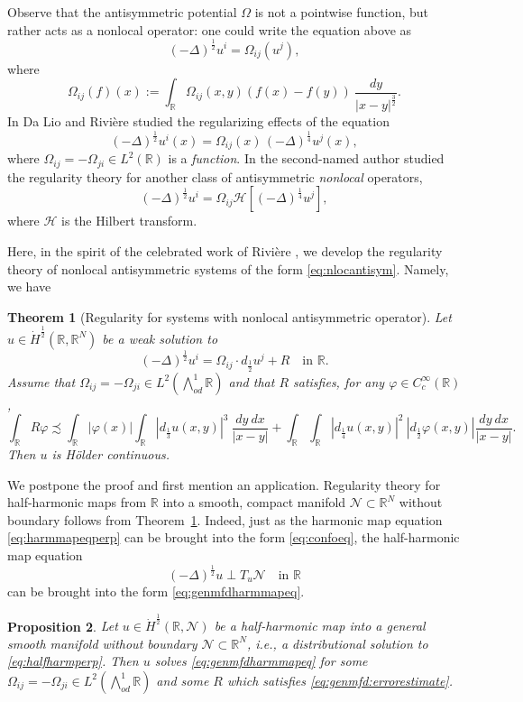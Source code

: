 \documentclass[12pt]{amsart}
\newtheorem{theorem}{Theorem}
\newtheorem{proposition}[theorem]{Proposition}
\theoremstyle{definition}
\newcommand{\R}{\mathbb{R}}
\newcommand{\Ep}{\bigwedge\nolimits}
\numberwithin{theorem}{section} \numberwithin{equation}{section}
\newcommand{\lap}{\Delta }
\newcommand{\aleq}{\precsim}
\newcommand{\lapv}{(-\lap)^{\frac{1}{4}}}
\newcommand{\laph}{(-\lap)^{\frac{1}{2}}}
\begin{document}
Observe that the antisymmetric potential $\Omega$ is not a pointwise function, but rather acts as a nonlocal operator: one could write the equation above as
\[
 \laph u^i = \Omega_{ij}(u^j),
\]
where
\[
 \Omega_{ij}(f)(x) := \int_{\R} \Omega_{ij}(x,y) (f(x)-f(y))\ \frac{dy}{|x-y|^{\frac{3}{2}}}.
\]
% 
In \cite{DaLio-Riviere-1Dmfd} Da Lio and Rivi\`{e}re studied the regularizing effects of the equation
\[
 \laph u^i(x) = \Omega_{ij}(x)\, \lapv u^j(x),
\]
where $\Omega_{ij} = -\Omega_{ji} \in L^2(\R)$ is a \emph{function}. In \cite{Schikorra-eps} the second-named author studied the regularity theory for another class of antisymmetric \emph{nonlocal} operators,
\[
 \laph u^i = \Omega_{ij} \mathcal{H}[\lapv u^j],
\]
where $\mathcal{H}$ is the Hilbert transform.

Here, in the spirit of the celebrated work of Rivi\`{e}re \cite{Riviere-2007}, we develop the regularity theory of nonlocal antisymmetric systems of the form \eqref{eq:nlocantisym}. Namely, we have
% 
\begin{theorem}[Regularity for systems with nonlocal antisymmetric operator]\label{th:nlao}
Let $u \in \dot{H}^{\frac{1}{2}}(\R,\R^N)$ be a weak solution to 
\begin{equation}\label{eq:genmfdharmmapeq}
 \laph u^i = \Omega_{ij} \cdot d_{\frac{1}{2}} u^j + R \quad \mbox{in $\R$}.
\end{equation}
Assume that $\Omega_{ij} = - \Omega_{ji} \in L^2(\Ep^1_{od} \R)$ and that $R$ satisfies, for any $\varphi \in C_c^\infty(\R)$,
\begin{equation}\label{eq:genmfd:errorestimate}
 \int_{\R} R \varphi \aleq \int_{\R}|\varphi(x)| \int_{\R} |d_{\frac{1}{3}}u(x,y)|^3\ \frac{dy\ dx}{|x-y|} + \int_{\R}\int_{\R} |d_{\frac{1}{4}}u(x,y)|^2\ |d_{\frac{1}{2}}\varphi(x,y)| \frac{dy\ dx}{|x-y|}.
\end{equation}
Then $u$ is H\"older continuous.
\end{theorem}
% 
We postpone the proof and first mention an application. 
Regularity theory for half-harmonic maps from $\R$ into a smooth, compact manifold $\mathcal{N} \subset \R^N$ without boundary follows from Theorem~\ref{th:nlao}. Indeed, 
just as the harmonic map equation \eqref{eq:harmmapeqperp} can be brought into the form \eqref{eq:confoeq}, the half-harmonic map equation 
\begin{equation}\label{eq:halfharmperp}
 \laph u \perp T_u \mathcal{N} \quad \mbox{in $\R$}
\end{equation}
can be brought into the form \eqref{eq:genmfdharmmapeq}.
% 
\begin{proposition}\label{pr:genmfdEL}
Let $u \in \dot{H}^{\frac{1}{2}}(\R,\mathcal{N})$ be a half-harmonic map into a general smooth manifold without boundary $\mathcal{N}\subset \R^N$, i.e., a distributional solution to \eqref{eq:halfharmperp}. Then $u$ solves \eqref{eq:genmfdharmmapeq} for some $\Omega_{ij} = - \Omega_{ji} \in L^2(\Ep^1_{od} \R)$ and some $R$ which satisfies \eqref{eq:genmfd:errorestimate}.
\end{proposition}
\end{document}

